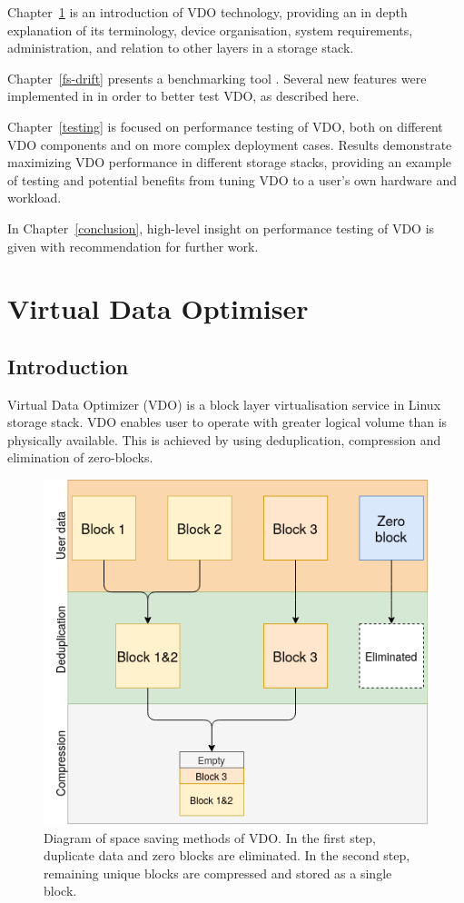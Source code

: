 \documentclass[
  color, %
  table, %
  lof,   %
  lot,   %
]{fithesis3}
\begin{document}
Chapter~\ref{VDO} is an introduction of VDO technology, providing an in depth explanation of its terminology, device organisation, system requirements, administration, and relation to other layers in a storage stack.

Chapter~\ref{fs-drift} presents a benchmarking tool \fsdrift. Several new features were implemented in \fsdrift in order to better test VDO, as described here.

Chapter~\ref{testing} is focused on performance testing of VDO, both on different VDO components and on more complex deployment cases. Results demonstrate maximizing VDO performance in different storage stacks, providing an example of testing and potential benefits from tuning VDO to a user's own hardware and workload.

In Chapter~\ref{conclusion}, high-level insight on performance testing of VDO is given with recommendation for further work.

\chapter{Virtual Data Optimiser}
\label{VDO}
\section{Introduction}
Virtual Data Optimizer (VDO) is a block layer virtualisation service in Linux storage stack. VDO enables user to operate with greater logical volume than is physically available. This is achieved by using deduplication, compression and elimination of zero-blocks.

\begin{figure}[!htb]
        \centering
        \includegraphics[width=\textwidth]{graphics/diagrams/space_saving.png}
        \caption[Space saving methods in VDO]{Diagram of space saving methods of VDO. In the first step, duplicate data and zero blocks are eliminated. In the second step, remaining unique blocks are compressed and stored as a single block.}
\label{fig:space_saving}
\end{figure}
\end{document}
